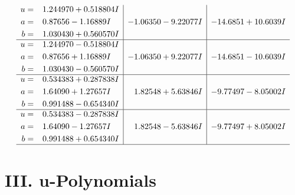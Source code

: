\documentclass[1p]{elsarticle_modified}
\theoremstyle{definition}
\begin{document}
$$\begin{array}{c|c|c}
\begin{aligned}
u &= \phantom{-}1.244970 + 0.518804 I \\
a &= \phantom{-}0.87656 - 1.16889 I \\
b &= \phantom{-}1.030430 + 0.560570 I\end{aligned}
 & -1.06350 - 9.22077 I & -14.6851 + 10.6039 I \\ \hline\begin{aligned}
u &= \phantom{-}1.244970 - 0.518804 I \\
a &= \phantom{-}0.87656 + 1.16889 I \\
b &= \phantom{-}1.030430 - 0.560570 I\end{aligned}
 & -1.06350 + 9.22077 I & -14.6851 - 10.6039 I \\ \hline\begin{aligned}
u &= \phantom{-}0.534383 + 0.287838 I \\
a &= \phantom{-}1.64090 + 1.27657 I \\
b &= \phantom{-}0.991488 - 0.654340 I\end{aligned}
 & \phantom{-}1.82548 + 5.63846 I & -9.77497 - 8.05002 I \\ \hline\begin{aligned}
u &= \phantom{-}0.534383 - 0.287838 I \\
a &= \phantom{-}1.64090 - 1.27657 I \\
b &= \phantom{-}0.991488 + 0.654340 I\end{aligned}
 & \phantom{-}1.82548 - 5.63846 I & -9.77497 + 8.05002 I\\
 \hline 
 \end{array}$$\newpage
\newpage\renewcommand{\arraystretch}{1}
\centering \section*{ III. u-Polynomials}
\end{document}
